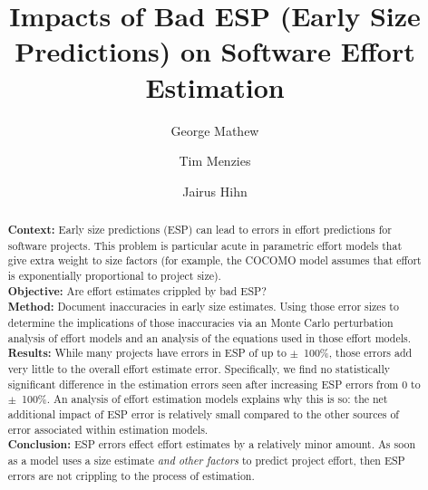 \documentclass[final,twocolumn]{elsarticle}
\theoremstyle{break}
\begin{document}
\begin{frontmatter}
\title{ Impacts of Bad ESP (Early Size Predictions) on Software Effort Estimation}
\author[add1]{George Mathew}
\author[add1]{Tim Menzies}
\author[add2]{Jairus Hihn}
\address[add1]{Department of Computer Science, North Carolina State University, Raleigh, NC, USA}
\address[add2]{Jet Propulsion Laboratory, Pasadena, CA, USA}


\small

\begin{abstract}
  \textbf{Context:}
  Early size predictions (ESP) can lead to errors in effort predictions for software projects.
  This problem is particular acute in parametric effort models that give extra weight to
  size factors (for example, the COCOMO model assumes that effort is exponentially proportional
  to project size).\\
  \textbf{Objective:} Are effort estimates crippled by bad ESP?
   \\
  \textbf{Method:} Document  inaccuracies in early
  size estimates. Using those error sizes to determine the implications of
  those inaccuracies via an Monte Carlo perturbation analysis of effort models
  and an analysis of the equations used in those effort
  models.\\
\textbf{Results:} 
While many 
projects have errors in ESP of up to $\pm$~100\%,
those errors add very
little to the overall effort estimate error. Specifically,
we find no statistically significant difference in
the estimation errors seen after
increasing ESP errors from 0 to $\pm$~100\%.
An analysis of effort estimation models explains why this is so:
the net additional impact  of ESP error is relatively  small compared to the other sources of error associated within
estimation models.\\
\textbf{Conclusion:} ESP errors effect effort estimates by a relatively
minor amount. As soon as a
model  uses a size
estimate {\em and other factors} to predict project effort,
then ESP errors  are not crippling to the process of estimation.
\end{abstract}
\end{frontmatter}
\end{document}
